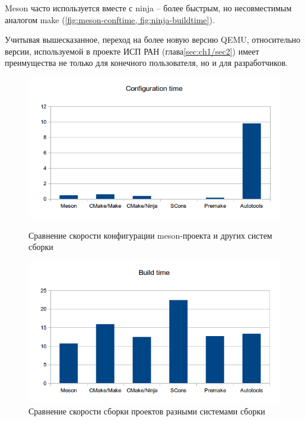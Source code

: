 Meson часто используется вместе с ninja \cite{ninja} -- более быстрым,
но несовместимым аналогом make (\cref{fig:meson-conftime, fig:ninja-buildtime}).

Учитывая вышесказанное, переход на более новую версию QEMU, относительно
версии, используемой в проекте ИСП РАН (глава\cref{sec:ch1/sec2})
имеет преимущества не только для конечного пользователя, но и для разработчиков.

\begin{figure}[!htbp]
    \centering
    \begin{adjustbox}{max totalsize={\textwidth}{\textheight}}
        \includegraphics[]{images/conftime.png}
    \end{adjustbox}
    \caption{Сравнение скорости конфигурации meson-проекта и других систем сборки}\label{fig:meson-conftime}

    \begin{adjustbox}{max totalsize={\textwidth}{\textheight}}
        \includegraphics[]{images/buildtime.png}
    \end{adjustbox}
    \caption{Сравнение скорости сборки проектов разными системами сборки}\label{fig:ninja-buildtime}
\end{figure}


